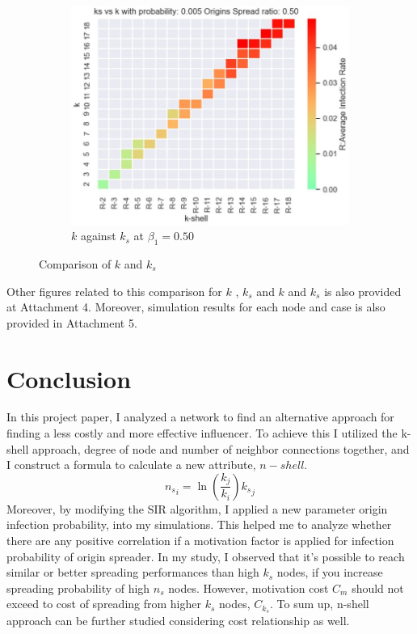 \documentclass[11pt,a4,twocolumn]{article}
\begin{document}
\begin{figure}[h]
\begin{subfigure}{.5\textwidth}
	\centerline{\includegraphics[scale=.4]{ks-k-005-50.jpg}}
	\caption{$k$ against $k_{s}$ at ${\beta}_{1} = 0.50$}
	\label{fig:fig2}
\end{subfigure}
\caption{Comparison of $k$ and $k_{s}$}
\label{fig:fig}
\end{figure}

Other figures related to this comparison for  $k$ , $k_{s}$ and  $k$ and $k_{s}$ is also provided at Attachment 4.  Moreover, simulation results for each node and case is also provided in Attachment 5.

\section{Conclusion} 

In this project paper, I analyzed a network to find an alternative approach for finding a less costly and more effective influencer. To achieve this  I utilized the k-shell approach, degree of node and number of neighbor connections together, and I construct a formula to calculate a new attribute, $n-shell$. 
\[
{n_{s}}_i = \ln{(\frac{k_{j}}{k_{i}})}{k_{s}}_j
\]
Moreover, by modifying the SIR algorithm, I applied a new parameter origin infection probability, into my simulations. This helped me to analyze whether there are any positive correlation if a motivation factor is applied for infection probability of origin spreader. In my study, I observed that it's possible to reach similar or better spreading performances than high $k_{s}$ nodes, if you increase spreading probability of high $n_{s}$ nodes. However, motivation cost $C_{m}$ should not exceed to cost of spreading from higher $k_{s}$ nodes, $C_{k_{s}}$. To sum up, n-shell approach can be further studied considering cost relationship as well.
\end{document}
